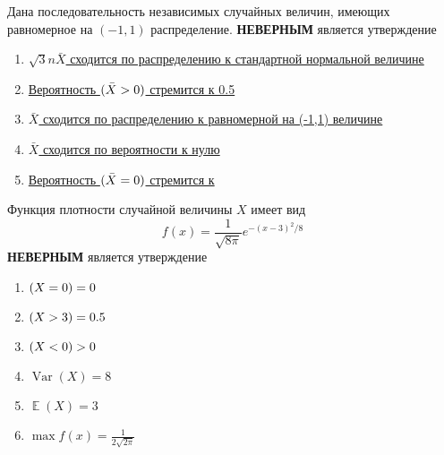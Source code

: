 \documentclass[t]{beamer}
\DeclareMathOperator{\Var}{Var}
\DeclareMathOperator{\E}{\mathbb{E}}
\let\P\relax
\DeclareMathOperator{\P}{\mathbb{P}}
\begin{document}
 \begin{frame} \label{29} 
\begin{block}{29} 

Дана последовательность независимых случайных величин, имеющих равномерное на $(-1,1)$ распределение.  \textbf{НЕВЕРНЫМ} является утверждение

 \end{block} 
\begin{enumerate} 
\item[] \hyperlink{29-No}{\beamergotobutton{} 	$\sqrt3n\bar X$ сходится по распределению к стандартной нормальной величине}
\item[] \hyperlink{29-No}{\beamergotobutton{} Вероятность	$\P(\bar X>0)$ стремится к 0.5}
\item[] \hyperlink{29-Yes}{\beamergotobutton{}   $\bar X$ сходится по распределению к равномерной на (-1,1) величине }
\item[] \hyperlink{29-No}{\beamergotobutton{} $\bar X$ сходится по вероятности к нулю}
\item[] \hyperlink{29-No}{\beamergotobutton{} Вероятность	$\P(\bar X = 0)$ стремится к}
\end{enumerate} 
\end{frame} 


 \begin{frame} \label{30} 
\begin{block}{30} 

Функция плотности случайной величины $X$ имеет вид
\[
f(x)=\frac{1}{\sqrt{8\pi}} e^{-(x-3)^2/8}
\]
 \textbf{НЕВЕРНЫМ} является утверждение
 


 \end{block} 
\begin{enumerate} 
\item[] \hyperlink{30-No}{\beamergotobutton{} $\P(X=0)=0$}
\item[] \hyperlink{30-No}{\beamergotobutton{} $\P(X>3)=0.5$}
\item[] \hyperlink{30-No}{\beamergotobutton{} $\P(X<0)>0$}
\item[] \hyperlink{30-Yes}{\beamergotobutton{} $\Var(X)=8$ }
\item[] \hyperlink{30-No}{\beamergotobutton{} $\E(X)=3$}
\item[] \hyperlink{30-No}{\beamergotobutton{} $\max f(x) = \frac{1}{2\sqrt{2\pi}}$}
\end{enumerate} 
\end{frame} 
\end{document}
